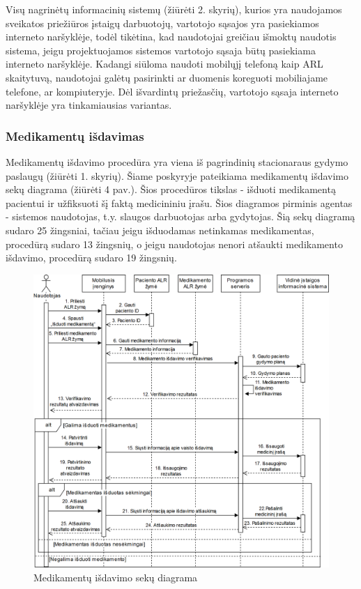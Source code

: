 Visų nagrinėtų informacinių sistemų (žiūrėti 2. skyrių), kurios yra naudojamos sveikatos priežiūros įstaigų darbuotojų, vartotojo sąsajos yra pasiekiamos interneto naršyklėje, todėl tikėtina, kad naudotojai greičiau išmoktų naudotis sistema, jeigu projektuojamos sistemos vartotojo sąsaja būtų pasiekiama interneto naršyklėje. Kadangi siūloma naudoti mobilųjį telefoną kaip ARL skaitytuvą, naudotojai galėtų pasirinkti ar duomenis koreguoti mobiliajame telefone, ar kompiuteryje. Dėl išvardintų priežasčių, vartotojo sąsaja interneto naršyklėje yra tinkamiausias variantas.

\subsubsection{Medikamentų išdavimas}
Medikamentų išdavimo procedūra yra viena iš pagrindinių stacionaraus gydymo paslaugų (žiūrėti 1. skyrių). Šiame poskyryje pateikiama medikamentų išdavimo sekų diagrama (žiūrėti 4 pav.). Šios procedūros tikslas - išduoti medikamentą pacientui ir užfiksuoti šį faktą medicininiu įrašu. Šios diagramos pirminis agentas - sistemos naudotojas, t.y. slaugos darbuotojas arba gydytojas. Šią sekų diagramą sudaro 25 žingsniai, tačiau jeigu išduodamas netinkamas medikamentas, procedūrą sudaro 13 žingsnių, o jeigu naudotojas nenori atšaukti medikamento išdavimo, procedūrą sudaro 19 žingsnių.

\begin{figure}[H]
    \centering
    \includegraphics[scale=0.27]{images/israsytiVaistai}
    \caption{Medikamentų išdavimo sekų diagrama} 
\end{figure}


